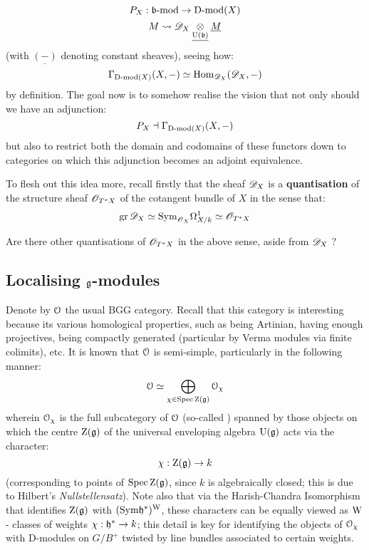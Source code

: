             $$P_X: \mathfrak{b}\text{-}\mathrm{mod} \to \mathrm{D}\text{-}\mathrm{mod}(X)$$
            $$M \mapsto \scrD_X \tensor_{\underline{\rmU(\b)}} \underline{M}$$
        (with $\underline{(-)}$ denoting constant sheaves), seeing how:
            $$\Gamma_{\mathrm{D}\text{-}\mathrm{mod}(X)}(X, -) \simeq \mathrm{Hom}_{\mathscr{D}_X}(\mathscr{D}_X, -)$$
        by definition. The goal now is to somehow realise the vision that not only should we have an adjunction:
            $$P_X \dashv \Gamma_{\mathrm{D}\text{-}\mathrm{mod}(X)}(X, -)$$
        but also to restrict both the domain and codomains of these functors down to categories on which this adjunction becomes an adjoint equivalence. 

        To flesh out this idea more, recall firstly that the sheaf $\mathscr{D}_X$ is a \textbf{quantisation} of the structure sheaf $\mathscr{O}_{T^*X}$ of the cotangent bundle of $X$ in the sense that:
            $$\operatorname{gr} \mathscr{D}_X \simeq \mathrm{Sym}_{\mathscr{O}_X} \Omega_{X/k}^1 \simeq \mathscr{O}_{T^*X}$$
        \begin{question}
            Are there other quantisations of $\mathscr{O}_{T^*X}$ in the above sense, aside from $\mathscr{D}_X$ ?
        \end{question}
            
    \subsection{Localising \texorpdfstring{$\mathfrak{g}$}{}-modules}
        Denote by $\mathcal{O}$ the usual BGG category. Recall that this category is interesting because its various homological properties, such as being Artinian, having enough projectives, being compactly generated (particular by Verma modules via finite colimits), etc. It is known that $\mathcal{O}$ is semi-simple, particularly in the following manner:
            $$\mathcal{O} \simeq \bigoplus_{\chi \in \operatorname{Spec} \mathrm{Z}(\mathfrak{g})} \mathcal{O}_{\chi}$$
        wherein $\mathcal{O}_{\chi}$ is the full subcategory of $\mathcal{O}$ (so-called ) spanned by those objects on which the centre $\mathrm{Z}(\mathfrak{g})$ of the universal enveloping algebra $\mathrm{U}(\mathfrak{g})$ acts via the character:
            $$\chi: \mathrm{Z}(\mathfrak{g}) \to k$$
        (corresponding to points of $\operatorname{Spec} \mathrm{Z}(\mathfrak{g})$, since $k$ is algebraically closed; this is due to Hilbert's \textit{Nullstellensatz}). Note also that via the Harish-Chandra Isomorphism that identifies $\mathrm{Z}(\mathfrak{g})$ with $(\mathrm{Sym} \mathfrak{h}^*)^{\mathrm{W}}$, these characters can be equally viewed as $\mathrm{W}$- classes of weights $\chi: \mathfrak{h}^* \to k$; this detail is key for identifying the objects of $\mathcal{O}_{\chi}$ with D-modules on $G/B^+$ twisted by line bundles associated to certain weights. 